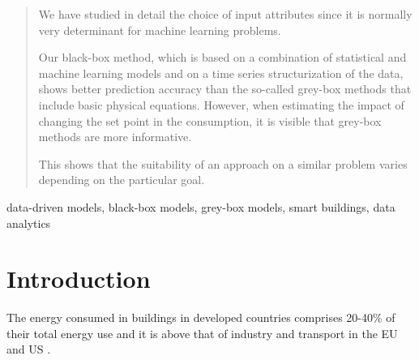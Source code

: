 \documentclass[10pt, conference, compsocconf]{IEEEtran}
\begin{document}
\begin{abstract}

We have studied in detail the choice of input attributes since it is normally very determinant for machine learning problems.

Our black-box method, which is based on a combination of statistical and machine learning models and on a time series structurization of the data, shows better prediction accuracy than the so-called grey-box methods that include basic physical equations. However, when estimating the impact of changing the set point in the consumption, it is visible that grey-box methods are more informative.

This shows that the suitability of an approach on a similar problem varies depending on the particular goal.


\end{abstract}

\begin{IEEEkeywords}
data-driven models, black-box models, grey-box models, smart buildings, data analytics

\end{IEEEkeywords}


%
\IEEEpeerreviewmaketitle



\section{Introduction} \label{intro}

The energy consumed in buildings in developed countries comprises 20-40\% of their total energy use and it is above that of industry and transport in the EU and US \cite{perez2008review, energyUS}. 
\end{document}
